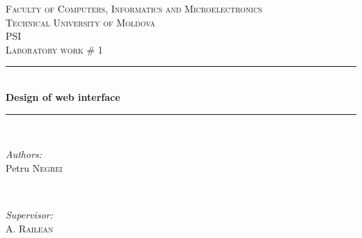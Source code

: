 \documentclass[12pt]{article}
\begin{document}
  \begin{titlepage}

 \newcommand{\HRule}{\rule{\linewidth}{0.5mm}} %
  \begin{center} %

  \textsc{\large Faculty of Computers, Informatics and Microelectronics}\\[0.5cm]
  \textsc{\large Technical University of Moldova}\\[1.2cm] %
  \vspace{35 mm}
  \textsc{\Large PSI}\\[0.5cm] %
  \textsc{\large Laboratory work \# 1}\\[0.5cm] %

  \vspace{10 mm}
  \HRule \\[0.4cm]
  { \LARGE \bfseries Design of  web interface }\\[0.4cm] %
  \HRule \\[1.5cm]

      \vspace{30mm}

      \begin{minipage}{0.4\textwidth}
      \begin{flushleft} \large
      \emph{Authors:}\\
      Petru \textsc{Negrei}
      \end{flushleft}
      \end{minipage}
      ~
      \begin{minipage}{0.4\textwidth}
      \begin{flushright} \large
      \emph{Supervisor:} \\
      A. \textsc{Railean} %
      \end{flushright}
      \end{minipage}\\[4cm]


\end{center}
\end{titlepage}
\end{document}
